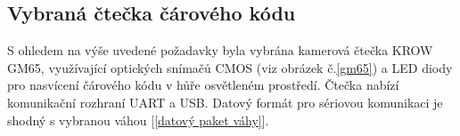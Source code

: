 




\subsection{Vybraná čtečka čárového kódu}



S ohledem na výše uvedené požadavky byla vybrána kamerová čtečka KROW GM65, využívající optických snímačů CMOS (viz obrázek č.\ref{gm65}) a LED diody pro nasvícení čárového kódu v hůře osvětleném prostředí. Čtečka nabízí komunikační rozhraní UART a USB. Datový formát pro sériovou komunikaci je shodný s vybranou váhou [\ref{datový paket váhy}].

